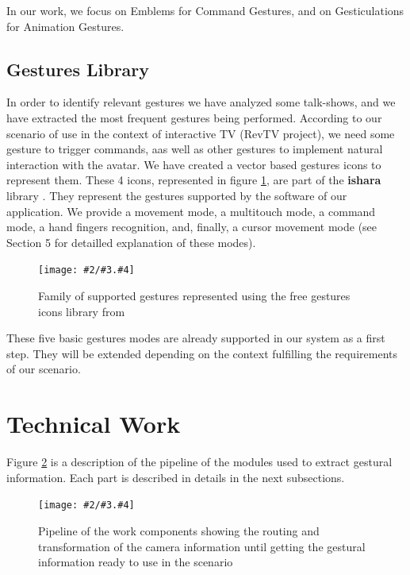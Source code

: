 \documentclass{llncs}
\newcommand{\imagepathext}[5]{%
\begin{figure}[!htbp]
\hfil\texttt{[image: \#2/\#3.\#4]}\hfil
\caption{#5\label{#3}}
\end{figure}}
\newcommand{\png}[2]{\imagepathext{width=\columnwidth}{pics}{#1}{png}{#2}}
\begin{document}
In our work, we focus on Emblems for Command Gestures, and on Gesticulations for Animation Gestures.

\subsection{Gestures Library}

In order to identify relevant gestures we have analyzed some talk-shows, and we have extracted the most frequent gestures being performed.
According to our scenario of use in the context of interactive TV (RevTV project), we need some
gesture to trigger commands, aas well as other gestures to implement natural interaction with the avatar.
We have created a vector based gestures icons to represent them.
These 4 icons, represented in figure \ref{handg}, are part of the \textbf{ishara} library \cite{ishara}.  They
represent the gestures supported by the software of our application. We provide a movement mode, a multitouch mode, a command mode, a hand fingers recognition,
and, finally, a cursor movement mode (see Section 5 for detailled explanation of these modes).

\png{handg}{Family of supported gestures represented using the free gestures icons library from \cite{ishara}}

These five basic gestures modes are already supported in our system as a first step. They will be extended depending on the context fulfilling the requirements
of our scenario.

\section{Technical Work}

Figure \ref{pipeline} is a description of the pipeline of the modules used to
extract gestural information. Each part is described in details in the next
subsections.

\png{pipeline}{Pipeline of the work components showing the routing and
transformation of the camera information until getting the gestural information
ready to use in the scenario}
\end{document}
